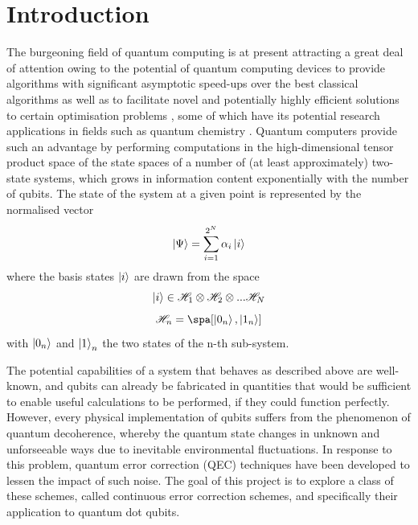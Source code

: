 \documentclass{report}
\begin{document}
\chapter{Introduction}
The burgeoning field of quantum computing is at present attracting a great deal of attention owing to the potential of quantum computing devices to provide algorithms with significant asymptotic speed-ups over the best classical algorithms \cite{shor_1997} as well as to facilitate novel and potentially highly efficient solutions to certain optimisation problems \cite{tilly_2022}, some of which have its potential research applications in fields such as quantum chemistry \cite{cao_2019}. Quantum computers provide such an advantage by performing computations in the high-dimensional tensor product space of the state spaces of a number of (at least approximately) two-state systems, which grows in information content exponentially with the number of qubits. The state of the system at a given point is represented by the normalised vector 
\begin{equation*}
    \ket{\Psi} = \sum_{i = 1}^{2^N}{\alpha_i \ket{i}}
\end{equation*}
where the basis states $\ket{i}$ are drawn from the space
\begin{equation*}
    \ket{i} \in \mathscr{H}_1 \otimes \mathscr{H}_2 \otimes ... \mathscr{H}_N
\end{equation*}
\begin{equation*}
    \mathscr{H}_n = \spa[\ket{0_n},\ket{1_n}]
\end{equation*} with $\ket{0_n}$ and $\ket{1}_n$ the two states of the n-th sub-system.

The potential capabilities of a system that behaves as described above are well-known, and qubits can already be fabricated in quantities that would be sufficient to enable useful calculations to be performed, if they could function perfectly. However, every physical implementation of qubits suffers from the phenomenon of quantum decoherence, whereby the quantum state changes in unknown and unforseeable ways due to inevitable environmental fluctuations. In response to this problem, quantum error correction (QEC) techniques have been developed to lessen the impact of such noise. The goal of this project is to explore a class of these schemes, called continuous error correction schemes, and specifically their application to quantum dot qubits.
\end{document}
